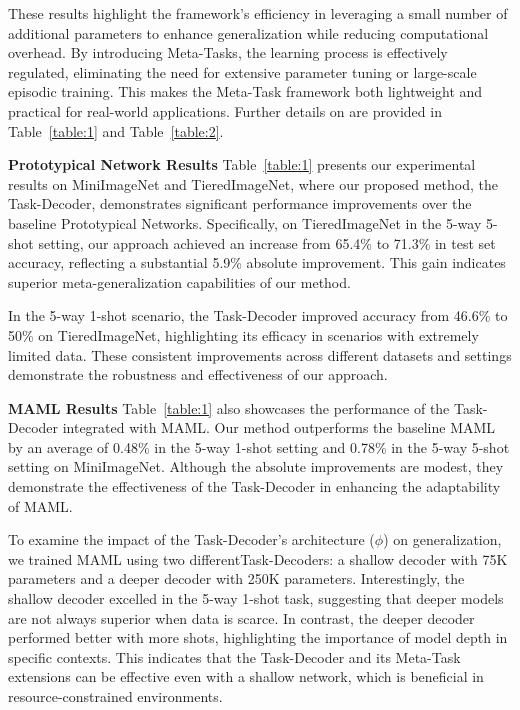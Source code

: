 These results highlight the framework's efficiency in leveraging a small number of additional parameters to enhance generalization while reducing computational overhead. By introducing Meta-Tasks, the learning process is effectively regulated, eliminating the need for extensive parameter tuning or large-scale episodic training. This makes the Meta-Task framework both lightweight and practical for real-world applications. Further details on are provided in Table~\ref{table:1} and Table~\ref{table:2}.
  
\textbf{Prototypical Network Results}
Table~\ref{table:1} presents our experimental results on MiniImageNet and TieredImageNet, where our proposed method, the Task-Decoder, demonstrates significant performance improvements over the baseline Prototypical Networks. Specifically, on TieredImageNet in the 5-way 5-shot setting, our approach achieved an increase from 65.4\% to 71.3\% in test set accuracy, reflecting a substantial 5.9\% absolute improvement. This gain indicates superior meta-generalization capabilities of our method.

In the 5-way 1-shot scenario, the Task-Decoder improved accuracy from 46.6\% to 50\% on TieredImageNet, highlighting its efficacy in scenarios with extremely limited data. These consistent improvements across different datasets and settings demonstrate the robustness and effectiveness of our approach.

\textbf{MAML Results}
Table~\ref{table:1} also showcases the performance of the {Task-Decoder} integrated with MAML. Our method outperforms the baseline MAML by an average of 0.48\% in the 5-way 1-shot setting and 0.78\% in the 5-way 5-shot setting on MiniImageNet. Although the absolute improvements are modest, they demonstrate the effectiveness of the {Task-Decoder} in enhancing the adaptability of MAML.
  
To examine the impact of the {Task-Decoder's} architecture ($\phi$) on generalization, we trained MAML using two different{Task-Decoders}: a shallow decoder with 75K parameters and a deeper decoder with 250K parameters. Interestingly, the shallow decoder excelled in the 5-way 1-shot task, suggesting that deeper models are not always superior when data is scarce. In contrast, the deeper decoder performed better with more shots, highlighting the importance of model depth in specific contexts. This indicates that the Task-Decoder and its Meta-Task extensions can be effective even with a shallow network, which is beneficial in resource-constrained environments.
  
